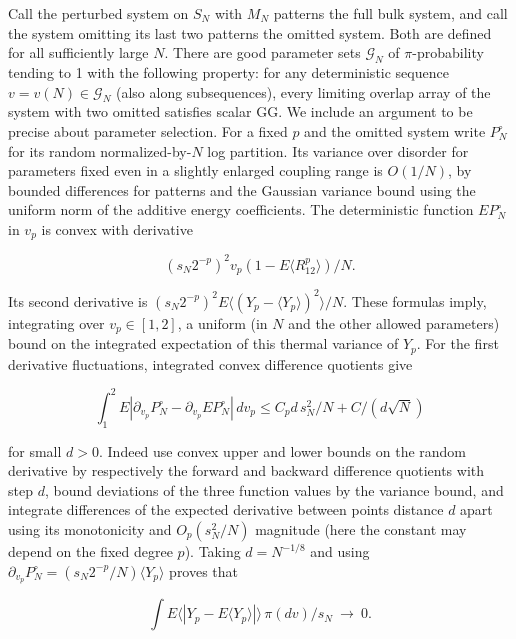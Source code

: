 \documentclass[11pt]{article}
\begin{document}
Call the perturbed system on $S_N$ with $M_N$ patterns the full bulk system, and call the system omitting its last two patterns the omitted system. Both are defined for all sufficiently large $N$. There are good parameter sets $\mathcal G_N$ of $\pi$-probability tending to 1 with the following property: for any deterministic sequence $v=v(N)\in\mathcal G_N$ (also along subsequences), every limiting overlap array of the system with two omitted satisfies scalar GG. We include an argument to be precise about parameter selection. For a fixed $p$ and the omitted system write $P_N^{\circ}$ for its random normalized-by-$N$ log partition. Its variance over disorder for parameters fixed even in a slightly enlarged coupling range is $O(1/N)$, by bounded differences for patterns and the Gaussian variance bound using the uniform norm of the additive energy coefficients. The deterministic function $E P_N^{\circ}$ in $v_p$ is convex with derivative

\begin{equation*}
(s_N2^{-p})^2 v_p (1-E\langle R_{12}^p\rangle)/N.
\end{equation*}

Its second derivative is $(s_N2^{-p})^2 E\langle (Y_p-\langle Y_p\rangle)^2\rangle/N$. These formulas imply, integrating over $v_p\in[1,2]$, a uniform (in $N$ and the other allowed parameters) bound on the integrated expectation of this thermal variance of $Y_p$. For the first derivative fluctuations, integrated convex difference quotients give

\begin{equation*}
\int_1^2 E|\partial_{v_p}P_N^{\circ}-\partial_{v_p}E P_N^{\circ}|\,dv_p
 \le C_p d\,s_N^2/N+C/(d\sqrt N)
\end{equation*}

for small $d>0$. Indeed use convex upper and lower bounds on the random derivative by respectively the forward and backward difference quotients with step $d$, bound deviations of the three function values by the variance bound, and integrate differences of the expected derivative between points distance $d$ apart using its monotonicity and $O_p(s_N^2/N)$ magnitude (here the constant may depend on the fixed degree $p$). Taking $d=N^{-1/8}$ and using $\partial_{v_p}P_N^{\circ}=(s_N2^{-p}/N)\langle Y_p\rangle$ proves that

\begin{equation*}
\int E\langle |Y_p-E\langle Y_p\rangle|\rangle\,\pi(dv)/s_N\ \longrightarrow\ 0 .
\end{equation*}
\end{document}
